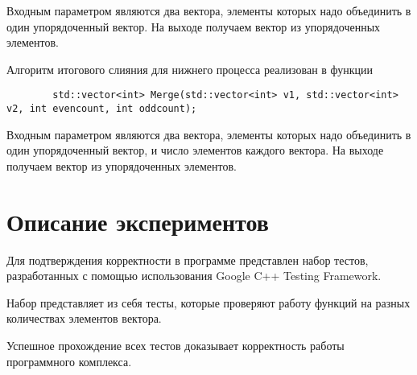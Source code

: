 \documentclass{report}
\begin{document}
	\par Входным параметром являются два вектора, элементы которых надо объединить в один упорядоченный вектор. На выходе получаем вектор из упорядоченных элементов.
	\par Алгоритм итогового слияния для нижнего процесса реализован в функции
	\begin{lstlisting}
		std::vector<int> Merge(std::vector<int> v1, std::vector<int> v2, int evencount, int oddcount);
	\end{lstlisting}
	\par Входным параметром являются два вектора, элементы которых надо объединить в один упорядоченный вектор, и число элементов каждого вектора. На выходе получаем вектор из упорядоченных элементов.
	\newpage
	
	\section*{Описание экспериментов}
	Для подтверждения корректности в программе представлен набор тестов, разработанных с помощью использования Google C++ Testing Framework.
	\par Набор представляет из себя тесты, которые проверяют работу функций на разных количествах элементов вектора.
	\par Успешное прохождение всех тестов доказывает корректность работы программного комплекса.
	\newpage
	
\end{document}
